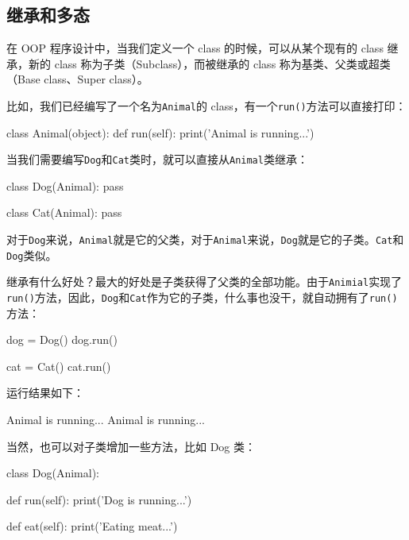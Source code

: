 \hypertarget{ux7ee7ux627fux548cux591aux6001}{%
\subsection{继承和多态}\label{ux7ee7ux627fux548cux591aux6001}}

在 OOP 程序设计中，当我们定义一个 class 的时候，可以从某个现有的 class
继承，新的 class 称为子类（Subclass），而被继承的 class
称为基类、父类或超类（Base class、Super class）。

比如，我们已经编写了一个名为\texttt{Animal}的
class，有一个\texttt{run()}方法可以直接打印：

\begin{pythoncode}
class Animal(object):
    def run(self):
        print('Animal is running...')
\end{pythoncode}

当我们需要编写\texttt{Dog}和\texttt{Cat}类时，就可以直接从\texttt{Animal}类继承：

\begin{pythoncode}
class Dog(Animal):
    pass

class Cat(Animal):
    pass
\end{pythoncode}

对于\texttt{Dog}来说，\texttt{Animal}就是它的父类，对于\texttt{Animal}来说，\texttt{Dog}就是它的子类。\texttt{Cat}和\texttt{Dog}类似。

继承有什么好处？最大的好处是子类获得了父类的全部功能。由于\texttt{Animial}实现了\texttt{run()}方法，因此，\texttt{Dog}和\texttt{Cat}作为它的子类，什么事也没干，就自动拥有了\texttt{run()}方法：

\begin{pythoncode}
dog = Dog()
dog.run()

cat = Cat()
cat.run()
\end{pythoncode}

运行结果如下：

\begin{pythoncode}
Animal is running...
Animal is running...
\end{pythoncode}

当然，也可以对子类增加一些方法，比如 Dog 类：

\begin{pythoncode}
class Dog(Animal):

    def run(self):
        print('Dog is running...')

    def eat(self):
        print('Eating meat...')
\end{pythoncode}

